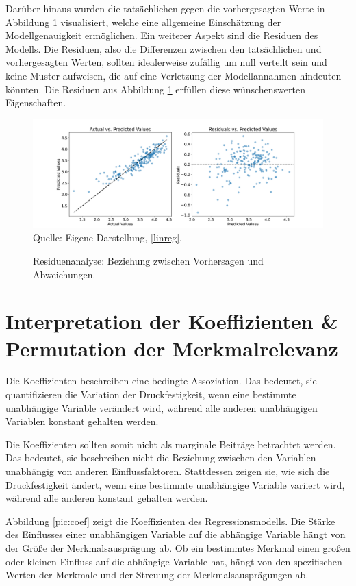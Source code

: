 Darüber hinaus wurden die tatsächlichen gegen die vorhergesagten Werte
in Abbildung \ref{pic:residuals} visualisiert, welche eine allgemeine Einschätzung der 
Modellgenauigkeit ermöglichen. Ein weiterer Aspekt sind die Residuen des Modells. 
Die Residuen, also die Differenzen zwischen den tatsächlichen und vorhergesagten Werten, 
sollten idealerweise zufällig um null verteilt sein und keine Muster aufweisen, 
die auf eine Verletzung der Modellannahmen hindeuten könnten. Die Residuen aus Abbildung \ref{pic:residuals} 
erfüllen diese wünschenswerten Eigenschaften.

\begin{figure}[!h]
    \caption{Residuenanalyse: Beziehung zwischen Vorhersagen und Abweichungen.}
    \includegraphics[width=1\textwidth]{../scripts/images/residuals.png}
    Quelle: Eigene Darstellung, \ref{linreg}.
    \label{pic:residuals}
\end{figure}


\section{Interpretation der Koeffizienten \& Permutation der Merkmalrelevanz}

Die Koeffizienten beschreiben eine bedingte Assoziation. Das bedeutet, sie quantifizieren die 
Variation der Druckfestigkeit, wenn eine bestimmte unabhängige Variable 
verändert wird, während alle anderen unabhängigen Variablen konstant gehalten werden.

Die Koeffizienten sollten somit nicht als marginale Beiträge betrachtet werden. 
Das bedeutet, sie beschreiben nicht die Beziehung zwischen den Variablen unabhängig von anderen Einflussfaktoren. 
Stattdessen zeigen sie, wie sich die Druckfestigkeit ändert, wenn eine bestimmte unabhängige Variable variiert wird, 
während alle anderen konstant gehalten werden.

Abbildung \ref{pic:coef} zeigt die Koeffizienten des Regressionsmodells. Die Stärke des Einflusses einer 
unabhängigen Variable auf die abhängige Variable hängt von der Größe der Merkmalsausprägung ab. 
Ob ein bestimmtes Merkmal einen großen oder kleinen Einfluss auf die abhängige Variable hat, hängt
von den spezifischen Werten der Merkmale und der Streuung der Merkmalsausprägungen ab. 

